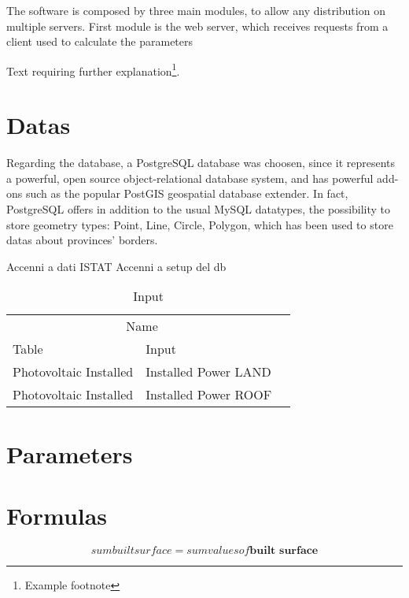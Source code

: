 \documentclass[twoside,twocolumn]{article}
\begin{document}
The software is composed by three main modules, to allow any distribution on multiple servers. First module is the web server, which receives requests from a client used to calculate the parameters

Text requiring further explanation\footnote{Example footnote}.


\section{Datas}
Regarding the database, a PostgreSQL database was choosen, since it represents a powerful, open source object-relational database system, and has powerful add-ons such as the popular PostGIS geospatial database extender. In fact, PostgreSQL offers in addition to the usual MySQL datatypes, the possibility to store geometry types: Point, Line, Circle, Polygon, which has been used to store datas about provinces' borders.

Accenni a dati ISTAT
Accenni a setup del db

\begin{table}
	\caption{Input}
	\centering
	\begin{tabular}{llr}
		\toprule
		\multicolumn{2}{c}{Name} \\
		\cmidrule(r){1-2}
		Table & Input\\
		\midrule
		Photovoltaic Installed & Installed Power LAND\\
		Photovoltaic Installed & Installed Power ROOF\\
		\bottomrule
	\end{tabular}
\end{table}
		

\section{Parameters}



\section{Formulas}

\begin{equation}
\label{eq:emc}
sum built surface = sum values of \textbf{built surface}
\end{equation}
\end{document}
